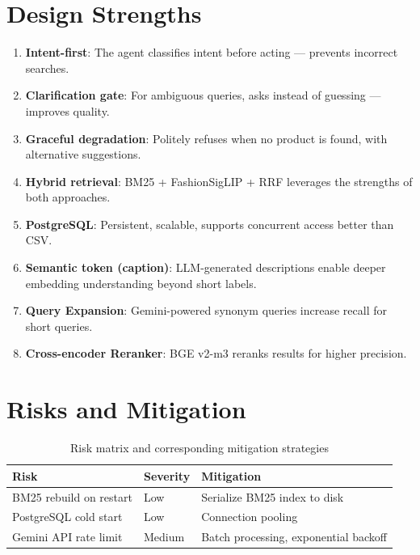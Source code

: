 
\section{Design Strengths}
\begin{enumerate}
    \item \textbf{Intent-first}: The agent classifies intent before acting --- prevents incorrect searches.
    \item \textbf{Clarification gate}: For ambiguous queries, asks instead of guessing --- improves quality.
    \item \textbf{Graceful degradation}: Politely refuses when no product is found, with alternative suggestions.
    \item \textbf{Hybrid retrieval}: BM25 + FashionSigLIP + RRF leverages the strengths of both approaches.
    \item \textbf{PostgreSQL}: Persistent, scalable, supports concurrent access better than CSV.
    \item \textbf{Semantic token (caption)}: LLM-generated descriptions enable deeper embedding understanding beyond short labels.
    \item \textbf{Query Expansion}: Gemini-powered synonym queries increase recall for short queries.
    \item \textbf{Cross-encoder Reranker}: BGE v2-m3 reranks results for higher precision.
\end{enumerate}

\section{Risks and Mitigation}

\begin{table}[H]
\centering
\begin{tabular}{lll}
\toprule
\textbf{Risk} & \textbf{Severity} & \textbf{Mitigation}\\
\midrule

BM25 rebuild on restart              & Low    & Serialize BM25 index to disk\\
PostgreSQL cold start                & Low    & Connection pooling\\
Gemini API rate limit                & Medium & Batch processing, exponential backoff\\
\bottomrule
\end{tabular}
\caption{Risk matrix and corresponding mitigation strategies}
\end{table}

